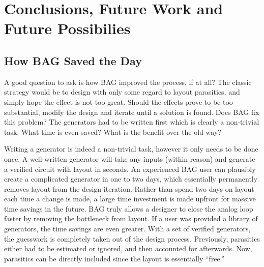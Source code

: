 \chapter{Conclusions, Future Work and Future Possibilies}

\section{How BAG Saved the Day}
A good question to ask is how BAG improved the process, if at all? The classic strategy would be to design with only some regard to layout parasitics, and simply hope the effect is not too great. Should the effects prove to be too substantial, modify the design and iterate until a solution is found. Does BAG fix this problem? The generators had to be written first which is clearly a non-trivial task. What time is even saved? What is the benefit over the old way? 

Writing a generator is indeed a non-trivial task, however it only needs to be done once. A well-written generator will take any inputs (within reason) and generate a verified circuit with layout in seconds. An experienced BAG user can plausibly create a complicated generator in one to two days, which essentially permanently removes layout from the design iteration. Rather than spend two days on layout each time a change is made, a large time investment is made upfront for massive time savings in the future. BAG truly allows a designer to close the analog loop faster by removing the bottleneck from layout. If a user was provided a library of generators, the time savings are even greater. With a set of verified generators, the guesswork is completely taken out of the design process. Previously, parasitics either had to be estimated or ignored, and then accounted for afterwards. Now, parasitics can be directly included since the layout is essentially ``free.'' 

